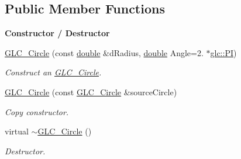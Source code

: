 \subsection*{Public Member Functions}
\begin{Indent}{\bf Constructor / Destructor}\par
\begin{DoxyCompactItemize}
\item 
\hyperlink{class_g_l_c___circle_acdb0e3dd1eb4f2324a154cebadcf3a33}{G\-L\-C\-\_\-\-Circle} (const \hyperlink{_super_l_u_support_8h_a8956b2b9f49bf918deed98379d159ca7}{double} \&d\-Radius, \hyperlink{_super_l_u_support_8h_a8956b2b9f49bf918deed98379d159ca7}{double} Angle=2. $\ast$\hyperlink{namespaceglc_ad0f268df7555a0084f6f242e599a0572}{glc\-::\-P\-I})
\begin{DoxyCompactList}\small\item\em Construct an \hyperlink{class_g_l_c___circle}{G\-L\-C\-\_\-\-Circle}. \end{DoxyCompactList}\item 
\hyperlink{class_g_l_c___circle_a21ec4aaf8072fa97bf6664a993a7bc37}{G\-L\-C\-\_\-\-Circle} (const \hyperlink{class_g_l_c___circle}{G\-L\-C\-\_\-\-Circle} \&source\-Circle)
\begin{DoxyCompactList}\small\item\em Copy constructor. \end{DoxyCompactList}\item 
virtual \hyperlink{class_g_l_c___circle_a7647cd3c1186f94e8e80a9c3c06b7fe8}{$\sim$\-G\-L\-C\-\_\-\-Circle} ()
\begin{DoxyCompactList}\small\item\em Destructor. \end{DoxyCompactList}\end{DoxyCompactItemize}
\end{Indent}

